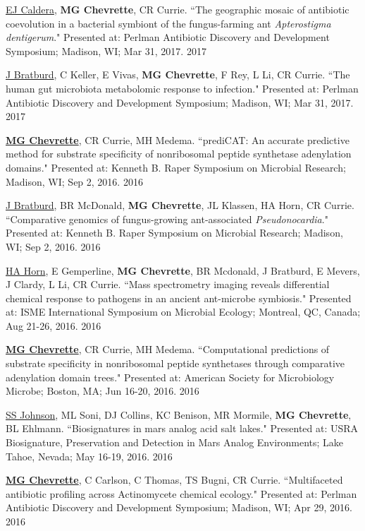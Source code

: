 \begin{cvpubs}
\cvpub
{\underline{EJ Caldera}, \textbf{MG Chevrette}, CR Currie. ``The geographic mosaic of antibiotic coevolution in a bacterial symbiont of the fungus-farming ant \textit{Apterostigma dentigerum}." Presented at: Perlman Antibiotic Discovery and Development Symposium; Madison, WI; Mar 31, 2017.}
{2017}

\cvpub
{\underline{J Bratburd}, C Keller, E Vivas, \textbf{MG Chevrette}, F Rey, L Li, CR Currie. ``The human gut microbiota metabolomic response to infection." Presented at: Perlman Antibiotic Discovery and Development Symposium; Madison, WI; Mar 31, 2017.}
{2017}

\cvpub
{\textbf{\underline{MG Chevrette}}, CR Currie, MH Medema.  ``prediCAT: An accurate predictive method for substrate specificity of nonribosomal peptide synthetase adenylation domains." Presented at: Kenneth B. Raper Symposium on Microbial Research; Madison, WI; Sep 2, 2016.}
{2016}

\cvpub
{\underline{J Bratburd}, BR McDonald, \textbf{MG Chevrette}, JL Klassen, HA Horn, CR Currie. ``Comparative genomics of fungus-growing ant-associated \textit{Pseudonocardia}." Presented at: Kenneth B. Raper Symposium on Microbial Research; Madison, WI; Sep 2, 2016.}
{2016}

\cvpub
{\underline{HA Horn}, E Gemperline, \textbf{MG Chevrette}, BR Mcdonald, J Bratburd, E Mevers, J Clardy, L Li, CR Currie. ``Mass spectrometry imaging reveals differential chemical response to pathogens in an ancient ant-microbe symbiosis." Presented at: ISME International Symposium on Microbial Ecology; Montreal, QC, Canada; Aug 21-26, 2016.}
{2016}

\cvpub
{\textbf{\underline{MG Chevrette}}, CR Currie, MH Medema.  ``Computational predictions of substrate specificity in nonribosomal peptide synthetases through comparative adenylation domain trees." Presented at: American Society for Microbiology Microbe; Boston, MA; Jun 16-20, 2016.}
{2016}

\end{cvpubs} \begin{cvpubs}

\cvpub
{\underline{SS Johnson}, ML Soni, DJ Collins, KC Benison, MR Mormile, \textbf{MG Chevrette}, BL Ehlmann. ``Biosignatures in mars analog acid salt lakes." Presented at: USRA Biosignature, Preservation and Detection in Mars Analog Environments; Lake Tahoe, Nevada; May 16-19, 2016.}
{2016}

\cvpub
{\textbf{\underline{MG Chevrette}}, C Carlson, C Thomas, TS Bugni, CR Currie. ``Multifaceted antibiotic profiling across Actinomycete chemical ecology." Presented at: Perlman Antibiotic Discovery and Development Symposium; Madison, WI; Apr 29, 2016.}
{2016}


\end{cvpubs}
